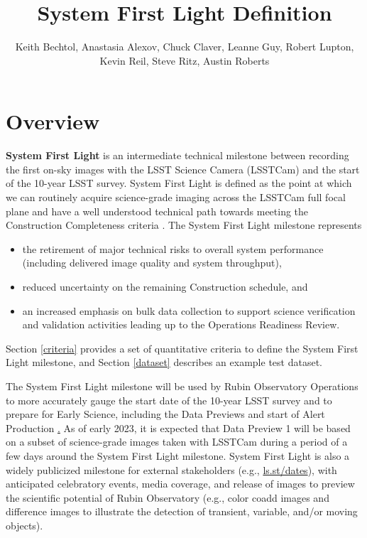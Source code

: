 \documentclass[SE,authoryear,toc]{lsstdoc}
\title{System First Light Definition}
\author{%
Keith Bechtol, Anastasia Alexov, Chuck Claver, Leanne Guy, Robert Lupton, Kevin Reil, Steve Ritz, Austin Roberts
}
\date{\vcsDate}
\begin{document}
\maketitle


\section{Overview}
\label{overview}

\textbf{System First Light} is an intermediate technical milestone between recording the first on-sky images with the LSST Science Camera (LSSTCam) and the start of the 10-year LSST survey.
System First Light is defined as the point at which we can routinely acquire science-grade imaging across the LSSTCam full focal plane and have a well understood technical path towards meeting the Construction Completeness criteria .
The System First Light milestone represents

\begin{itemize}
  \item the retirement of major technical risks to overall system performance (including delivered image quality and system throughput),
  \item reduced uncertainty on the remaining Construction schedule, and
  \item an increased emphasis on bulk data collection to support science verification and validation activities leading up to the Operations Readiness Review.
\end{itemize}

Section \ref{criteria} provides a set of quantitative criteria to define the System First Light milestone, and Section \ref{dataset} describes an example test dataset.

The System First Light milestone will be used by Rubin Observatory Operations to more accurately gauge the start date of the 10-year LSST survey and to prepare for Early Science, including the Data Previews and start of Alert Production  \href{https://rtn-011.lsst.io/}.
As of early 2023, it is expected that Data Preview 1 will be based on a subset of science-grade images taken with LSSTCam during a period of a few days around the System First Light milestone.
System First Light is also a widely publicized milestone for external stakeholders (e.g., \href{https://ls.st/dates}{ls.st/dates}), with anticipated celebratory events, media coverage, and release of images to preview the scientific potential of Rubin Observatory (e.g., color coadd images and difference images to illustrate the detection of transient, variable, and/or moving objects).
\end{document}
